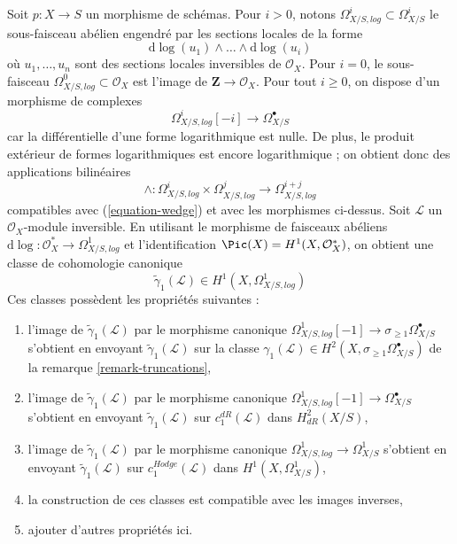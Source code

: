 \begin{remark}
\label{remark-log-forms}
Soit $p : X \to S$ un morphisme de schémas. Pour $i > 0$,
notons $\Omega^i_{X/S, log} \subset \Omega^i_{X/S}$ le sous-faisceau abélien
engendré par les sections locales de la forme
$$
\text{d}\log(u_1) \wedge \ldots \wedge \text{d}\log(u_i)
$$
où $u_1, \ldots, u_n$ sont des sections locales inversibles de $\mathcal{O}_X$.
Pour $i = 0$, le sous-faisceau $\Omega^0_{X/S, log} \subset \mathcal{O}_X$
est l'image de $\mathbf{Z} \to \mathcal{O}_X$. Pour tout $i \geq 0$,
on dispose d'un morphisme de complexes
$$
\Omega^i_{X/S, log}[-i] \longrightarrow \Omega^\bullet_{X/S}
$$
car la différentielle d'une forme logarithmique est nulle. De plus, le produit extérieur
de formes logarithmiques est encore logarithmique ; on obtient donc des applications bilinéaires
$$
\wedge :  \Omega^i_{X/S, log} \times
\Omega^j_{X/S, log} \longrightarrow \Omega^{i + j}_{X/S, log}
$$
compatibles avec (\ref{equation-wedge}) et avec les morphismes ci-dessus.
Soit $\mathcal{L}$ un $\mathcal{O}_X$-module inversible.
En utilisant le morphisme de faisceaux abéliens
$\text{d}\log : \mathcal{O}_X^* \to \Omega^1_{X/S, log}$
et l'identification $\Pic(X) = H^1(X, \mathcal{O}_X^*)$,
on obtient une classe de cohomologie canonique
$$
\tilde \gamma_1(\mathcal{L}) \in H^1(X, \Omega^1_{X/S, log})
$$
Ces classes possèdent les propriétés suivantes :
\begin{enumerate}
\item l'image de $\tilde \gamma_1(\mathcal{L})$ par le morphisme canonique
$\Omega^1_{X/S, log}[-1] \to \sigma_{\geq 1}\Omega^\bullet_{X/S}$
s'obtient en envoyant $\tilde \gamma_1(\mathcal{L})$ sur la classe
$\gamma_1(\mathcal{L}) \in 
H^2(X, \sigma_{\geq 1}\Omega^\bullet_{X/S})$
de la remarque \ref{remark-truncations},
\item l'image de $\tilde \gamma_1(\mathcal{L})$ par le morphisme canonique
$\Omega^1_{X/S, log}[-1] \to \Omega^\bullet_{X/S}$
s'obtient en envoyant $\tilde \gamma_1(\mathcal{L})$ sur $c_1^{dR}(\mathcal{L})$ dans
$H^2_{dR}(X/S)$,
\item l'image de $\tilde \gamma_1(\mathcal{L})$ par le morphisme canonique
$\Omega^1_{X/S, log} \to \Omega^1_{X/S}$
s'obtient en envoyant $\tilde \gamma_1(\mathcal{L})$ sur $c_1^{Hodge}(\mathcal{L})$ dans
$H^1(X, \Omega^1_{X/S})$,
\item la construction de ces classes est compatible avec les images inverses,
\item ajouter d'autres propriétés ici.
\end{enumerate}
\end{remark}





